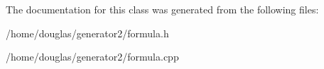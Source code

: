 The documentation for this class was generated from the following files\+:\begin{DoxyCompactItemize}
\item 
/home/douglas/generator2/formula.\+h\item 
/home/douglas/generator2/formula.\+cpp\end{DoxyCompactItemize}

